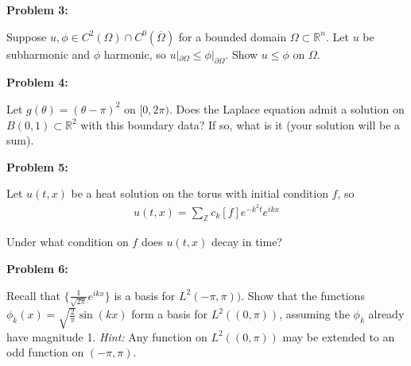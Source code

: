 \documentclass{article}
\newcommand{\Z}{{\mathbb{Z}}}
\newcommand{\R}{{\mathbb{R}}}
\newcommand{\cl}[1]{{\overline{#1}}}
\newcommand{\pd}{\partial}
\begin{document}
\textbf{Problem 3:}


Suppose $u,\phi \in C^{2}(\Omega) \cap C^{0}(\cl{\Omega})$ for a bounded domain $\Omega \subset \R^{n}$. Let $u$ be subharmonic and $\phi$ harmonic, so $u|_{\pd \Omega} \leq \phi|_{\pd \Omega}$. Show $u \leq \phi$ on $\Omega$. 



\textbf{Problem 4:} 

Let $g(\theta) = (\theta-\pi)^{2}$ on $[0,2\pi)$. Does the Laplace equation admit a solution on $B(0,1) \subset \R^{2}$ with this boundary data? If so, what is it (your solution will be a sum). 

\textbf{Problem 5:} 

Let $u(t,x)$ be a heat solution on the torus with initial condition $f$, so 
\begin{align*}
	u(t,x) = \sum_{\Z} c_{k}[f] e^{-k^{2}t}e^{ikx}
\end{align*}

Under what condition on $f$ does $u(t,x)$ decay in time? 

\textbf{Problem 6:}

Recall that $\{\frac{1}{\sqrt{2\pi}}e^{ikx}\}$ is a basis for $L^{2}(-\pi,\pi))$. Show that the functions $\phi_{k}(x) = \sqrt{\frac{2}{\pi}} \sin(kx)$ form a basis for $L^{2}((0,\pi))$, assuming the $\phi_{k}$ already have magnitude 1. \textit{Hint:} Any function on $L^{2}((0,\pi))$ may be extended to an odd function on $(-\pi,\pi)$. 
\end{document}
